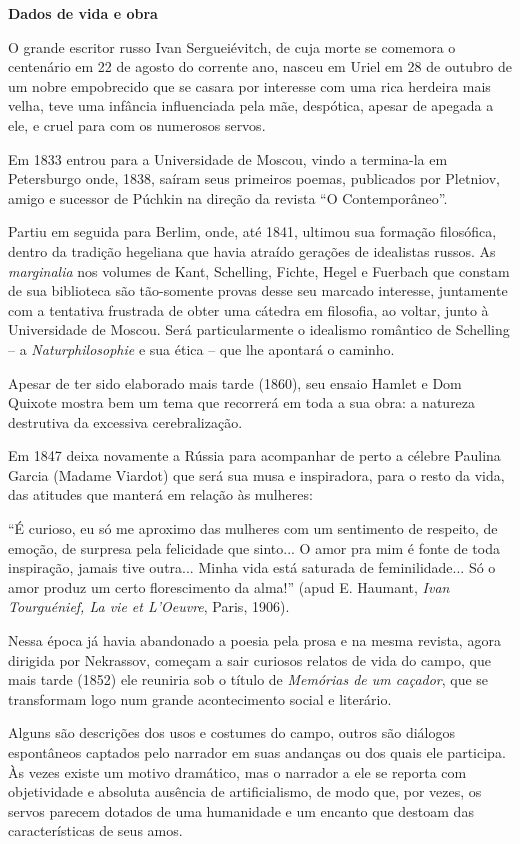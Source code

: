 \textbf{Dados de vida e obra}

O grande escritor russo Ivan Sergueiévitch, de cuja morte se comemora o
centenário em 22 de agosto do corrente ano, nasceu em Uriel em 28 de
outubro de um nobre empobrecido que se casara por interesse com uma rica
herdeira mais velha, teve uma infância influenciada pela mãe, despótica,
apesar de apegada a ele, e cruel para com os numerosos servos.

Em 1833 entrou para a Universidade de Moscou, vindo a termina-la em
Petersburgo onde, 1838, saíram seus primeiros poemas, publicados por
Pletniov, amigo e sucessor de Púchkin na direção da revista ``O
Contemporâneo''.

Partiu em seguida para Berlim, onde, até 1841, ultimou sua formação
filosófica, dentro da tradição hegeliana que havia atraído gerações de
idealistas russos. As \emph{marginalia} nos volumes de Kant, Schelling,
Fichte, Hegel e Fuerbach que constam de sua biblioteca são tão-somente
provas desse seu marcado interesse, juntamente com a tentativa frustrada
de obter uma cátedra em filosofia, ao voltar, junto à Universidade de
Moscou. Será particularmente o idealismo romântico de Schelling -- a
\emph{Naturphilosophie} e sua ética -- que lhe apontará o caminho.

Apesar de ter sido elaborado mais tarde (1860), seu ensaio Hamlet e Dom
Quixote mostra bem um tema que recorrerá em toda a sua obra: a natureza
destrutiva da excessiva cerebralização.

Em 1847 deixa novamente a Rússia para acompanhar de perto a célebre
Paulina Garcia (Madame Viardot) que será sua musa e inspiradora, para o
resto da vida, das atitudes que manterá em relação às mulheres:

``É curioso, eu só me aproximo das mulheres com um sentimento de
respeito, de emoção, de surpresa pela felicidade que sinto... O amor pra
mim é fonte de toda inspiração, jamais tive outra... Minha vida está
saturada de feminilidade... Só o amor produz um certo florescimento da
alma!'' (apud E. Haumant, \emph{Ivan Tourguénief, La vie et L'Oeuvre},
Paris, 1906).

Nessa época já havia abandonado a poesia pela prosa e na mesma revista,
agora dirigida por Nekrassov, começam a sair curiosos relatos de vida do
campo, que mais tarde (1852) ele reuniria sob o título de \emph{Memórias
de um caçador}, que se transformam logo num grande acontecimento social
e literário.

Alguns são descrições dos usos e costumes do campo, outros são diálogos
espontâneos captados pelo narrador em suas andanças ou dos quais ele
participa. Às vezes existe um motivo dramático, mas o narrador a ele se
reporta com objetividade e absoluta ausência de artificialismo, de modo
que, por vezes, os servos parecem dotados de uma humanidade e um encanto
que destoam das características de seus amos.

